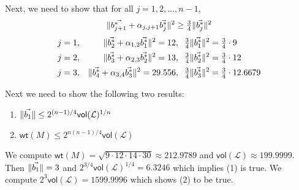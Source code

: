 \documentclass[11pt]{article}
\begin{document}
\begin{sol}
\begin{enumalph}
      Next, we need to show that for all $j=1,2,\dots,n-1$,
      \begin{equation*}
        \lVert \vec{b_{j+1}^*} + \alpha_{j,j+1}\vec{b_j^*} \rVert^2 \geq \tfrac{3}{4}\lVert \vec{b_j^*} \rVert^2
      \end{equation*}
      \begin{align*}
        j=1,&  &\lVert \vec{b_{2}^*} + \alpha_{1,2}\vec{b_1^*} \rVert^2=12,\;\;\tfrac{3}{4}\lVert \vec{b_1^*} \rVert^2&=\tfrac{3}{4}\cdot9\\
        j=2,&  &\lVert \vec{b_{3}^*} + \alpha_{2,3}\vec{b_2^*} \rVert^2=13,\;\;\tfrac{3}{4}\lVert \vec{b_2^*} \rVert^2&=\tfrac{3}{4}\cdot12\\
        j=3,&  &\lVert \vec{b_{4}^*} + \alpha_{3,4}\vec{b_3^*} \rVert^2=29.556,\;\;\tfrac{3}{4}\lVert \vec{b_3^*} \rVert^2&=\tfrac{3}{4}\cdot12.6679
      \end{align*}
    \item Next we need to show the following two results:
      \begin{enumerate}
        \item $\lVert \vec{b_1} \rVert\leq 2^{(n-1)/4}\mathsf{vol}({\mathcal{L}})^{1/n}$
        \item $\mathsf{wt}(M) \leq 2^{n(n-1)/4}\mathsf{vol}({\mathcal{L}})$
      \end{enumerate} We compute $\mathsf{wt}(M)=\sqrt{9\cdot12\cdot14\cdot30}\approx212.9789$ and $\mathsf{vol}({\mathcal{L}})\approx199.9999$. Then $\lVert \vec{b_1} \rVert=3$ and $2^{3/4}\mathsf{vol}({\mathcal{L}})^{1/4}=6.3246$ which implies (1) is true. We compute $2^{3}\mathsf{vol}({\mathcal{L}})=1599.9996$ which shows (2) to be true.
  \end{enumalph}
\end{sol}
\end{document}
